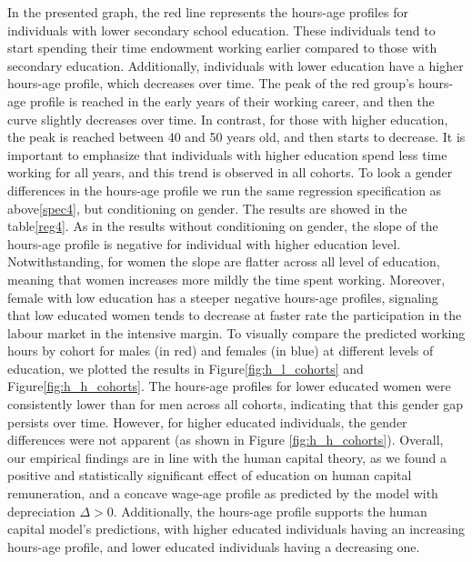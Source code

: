 \documentclass{sistedes}
\begin{document}
In the presented graph, the red line represents the hours-age profiles for individuals with lower secondary school education. These individuals tend to start spending their time endowment working earlier compared to those with secondary education. Additionally, individuals with lower education have a higher hours-age profile, which decreases over time. 
The peak of the red group's hours-age profile is reached in the early years of their working career, and then the curve slightly decreases over time. In contrast, for those with higher education, the peak is reached between 40 and 50 years old, and then starts to decrease. 
It is important to emphasize that individuals with higher education spend less time working for all years, and this trend is observed in all cohorts.
\newline
To look a gender differences in the hours-age profile we run the same regression specification as above\ref{spec4}, but conditioning on gender. The results are showed in the table\ref{reg4}. As in the results without conditioning on gender, the slope of the hours-age profile is negative for individual with higher education level. Notwithstanding, for women the slope are flatter across all level of education, meaning that women increases more mildly the time spent working.
Moreover, female with low education has a steeper negative hours-age profiles, signaling that low educated women tends to decrease at faster rate the participation in the labour market in the intensive margin.  
\newline
To visually compare the predicted working hours by cohort for males (in red) and females (in blue) at different levels of education, we plotted the results in Figure\ref{fig:h_l_cohorts} and Figure\ref{fig:h_h_cohorts}. The hours-age profiles for lower educated women were consistently lower than for men across all cohorts, indicating that this gender gap persists over time. However, for higher educated individuals, the gender differences were not apparent (as shown in Figure \ref{fig:h_h_cohorts}).
\newline
Overall, our empirical findings are in line with the human capital theory, as we found a positive and statistically significant effect of education on human capital remuneration, and a concave wage-age profile as predicted by the model with depreciation $\Delta > 0$. Additionally, the hours-age profile supports the human capital model's predictions, with higher educated individuals having an increasing hours-age profile, and lower educated individuals having a decreasing one.
\end{document}
